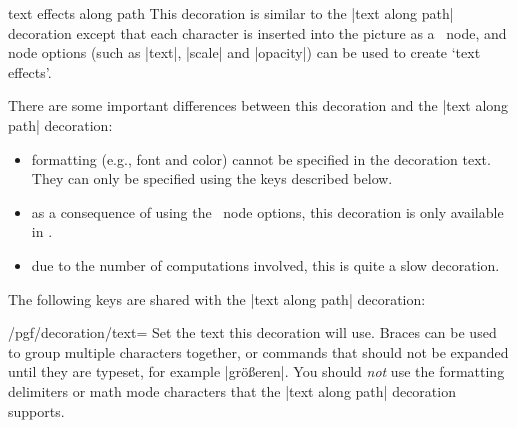 \begin{decoration}{text effects along path}
    This decoration is similar to the |text along path| decoration except that
    each character is inserted into the picture as a \tikzname\ node, and node
    options (such as |text|, |scale| and |opacity|) can be used to create `text
    effects'.
\begin{codeexample}[preamble={\usetikzlibrary{decorations.text,math}}]
\bfseries\large
{}
\end{codeexample}

    There are some important differences between this decoration and the
    |text along path| decoration:
    \begin{itemize}
        \item formatting (e.g., font and color) cannot be specified in the
            decoration text. They can only be specified using the keys
            described below.
        \item as a consequence of using the \tikzname\ node options, this
            decoration is only available in \tikzname.
        \item due to the number of computations involved, this is quite a slow
            decoration.
    \end{itemize}

    The following keys are shared with the |text along path| decoration:

    \begin{key}{/pgf/decoration/text=}
        Set the text this decoration will use. Braces can be used to group
        multiple characters together, or commands that should not be expanded
        until they are typeset, for example |gr{\"o}{\ss}eren|. You should
        \emph{not} use the formatting delimiters or math mode characters that
        the |text along path| decoration supports.
    \end{key}


\end{decoration}
